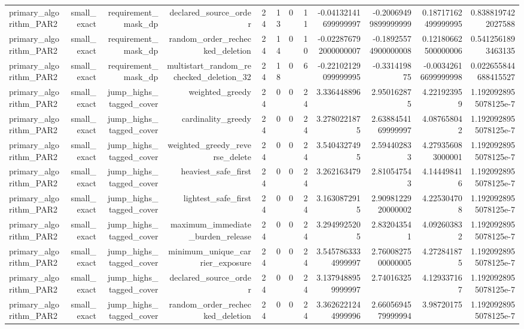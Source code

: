 {\begin{longtable}{lrrrrrrrrrrr}
primary\_algorithm\_PAR2 & small\_exact & requirement\_mask\_dp & declared\_source\_order & 24 & 13 & 0 & 11 & -0.04132141699999997 & -0.20069499899999999 & 0.18717162499999995 & 0.8388197422027588 \\
primary\_algorithm\_PAR2 & small\_exact & requirement\_mask\_dp & random\_order\_rechecked\_deletion & 24 & 14 & 0 & 10 & -0.022876792000000007 & -0.18925574900000008 & 0.12180662500000006 & 0.5412561893463135 \\
primary\_algorithm\_PAR2 & small\_exact & requirement\_mask\_dp & multistart\_random\_rechecked\_deletion\_32 & 24 & 18 & 0 & 6 & -0.22102129099999995 & -0.331419875 & -0.00342616699999998 & 0.022655844688415527 \\
primary\_algorithm\_PAR2 & small\_exact & jump\_highs\_tagged\_cover & weighted\_greedy & 24 & 0 & 0 & 24 & 3.336448896 & 2.950162875 & 4.221923959 & 1.1920928955078125e-7 \\
primary\_algorithm\_PAR2 & small\_exact & jump\_highs\_tagged\_cover & cardinality\_greedy & 24 & 0 & 0 & 24 & 3.2780221875 & 2.6388454169999997 & 4.087658042 & 1.1920928955078125e-7 \\
primary\_algorithm\_PAR2 & small\_exact & jump\_highs\_tagged\_cover & weighted\_greedy\_reverse\_delete & 24 & 0 & 0 & 24 & 3.5404327495 & 2.594402833 & 4.279356083000001 & 1.1920928955078125e-7 \\
primary\_algorithm\_PAR2 & small\_exact & jump\_highs\_tagged\_cover & heaviest\_safe\_first & 24 & 0 & 0 & 24 & 3.262163479 & 2.810547543 & 4.144498416 & 1.1920928955078125e-7 \\
primary\_algorithm\_PAR2 & small\_exact & jump\_highs\_tagged\_cover & lightest\_safe\_first & 24 & 0 & 0 & 24 & 3.1630872915 & 2.9098122920000002 & 4.225304708 & 1.1920928955078125e-7 \\
primary\_algorithm\_PAR2 & small\_exact & jump\_highs\_tagged\_cover & maximum\_immediate\_burden\_release & 24 & 0 & 0 & 24 & 3.2949925205 & 2.832043541 & 4.092603832 & 1.1920928955078125e-7 \\
primary\_algorithm\_PAR2 & small\_exact & jump\_highs\_tagged\_cover & minimum\_unique\_carrier\_exposure & 24 & 0 & 0 & 24 & 3.5457863334999997 & 2.7600827500000005 & 4.272841875 & 1.1920928955078125e-7 \\
primary\_algorithm\_PAR2 & small\_exact & jump\_highs\_tagged\_cover & declared\_source\_order & 24 & 0 & 0 & 24 & 3.1379488959999997 & 2.74016325 & 4.129337167 & 1.1920928955078125e-7 \\
primary\_algorithm\_PAR2 & small\_exact & jump\_highs\_tagged\_cover & random\_order\_rechecked\_deletion & 24 & 0 & 0 & 24 & 3.3626221244999996 & 2.6605694579999994 & 3.98720175 & 1.1920928955078125e-7 \\

\end{longtable}}
